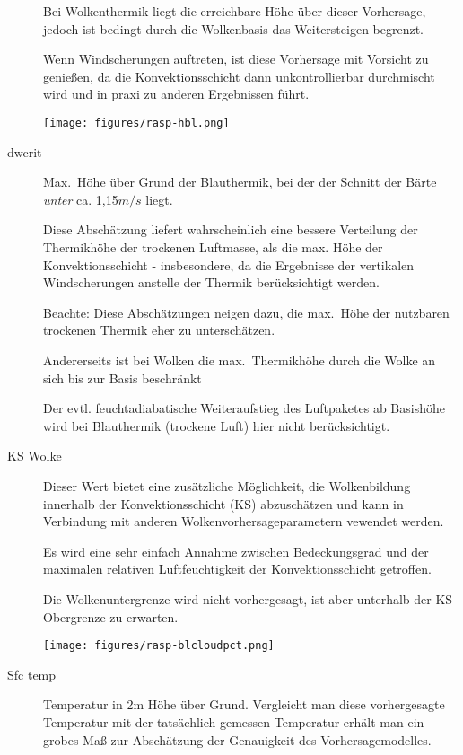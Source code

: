\begin{description}
Bei Wolkenthermik liegt die erreichbare Höhe über dieser Vorhersage, jedoch ist
bedingt durch die Wolkenbasis das Weitersteigen begrenzt.

Wenn Windscherungen auftreten, ist diese Vorhersage mit Vorsicht zu genießen,
da die Konvektionsschicht dann unkontrollierbar durchmischt wird und in praxi zu
anderen Ergebnissen führt.

\begin{center}
\texttt{[image: figures/rasp-hbl.png]}
\end{center}

\item[dwcrit]
Max.\ Höhe über Grund der Blauthermik, bei der der Schnitt der Bärte  \textsl{unter} ca. 1,15$m/s$ liegt.

Diese Abschätzung liefert  wahrscheinlich eine bessere Verteilung der Thermikhöhe
der trockenen Luftmasse, als die max. Höhe der Konvektionsschicht - insbesondere, 
da die Ergebnisse der vertikalen Windscherungen anstelle der Thermik berücksichtigt
werden.


Beachte: Diese Abschätzungen neigen dazu, die max.\ Höhe der
nutzbaren trockenen Thermik eher zu unterschätzen.

Andererseits ist bei Wolken die max.\ Thermikhöhe durch  die Wolke an sich bis
zur Basis  beschränkt

Der evtl. feuchtadiabatische Weiteraufstieg des Luftpaketes ab Basishöhe wird bei
Blauthermik (trockene Luft) hier nicht berücksichtigt.

\item[KS Wolke]
Dieser Wert bietet eine zusätzliche Möglichkeit, die Wolkenbildung innerhalb der
Konvektionsschicht (KS) abzuschätzen und kann in Verbindung mit anderen
Wolkenvorhersageparametern vewendet werden.

Es wird eine sehr einfach Annahme zwischen Bedeckungsgrad und der maximalen
relativen Luftfeuchtigkeit der Konvektionsschicht getroffen.

Die Wolkenuntergrenze wird nicht vorhergesagt, ist aber unterhalb der
 KS-Obergrenze zu erwarten.


\begin{center}
\texttt{[image: figures/rasp-blcloudpct.png]}
\end{center}

\item[Sfc temp]

Temperatur in 2m Höhe über Grund.
Vergleicht man diese vorhergesagte Temperatur mit der tatsächlich gemessen Temperatur
erhält man ein grobes Maß  zur Abschätzung der Genauigkeit des Vorhersagemodelles.


\end{description}
